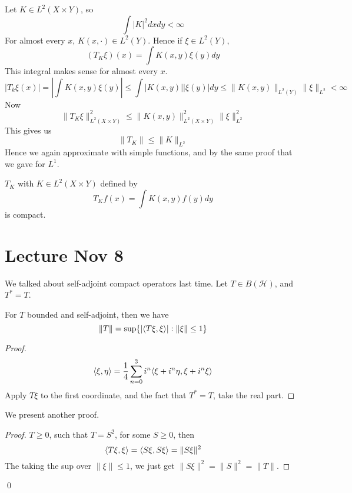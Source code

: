 Let $K\in L^2(X\times Y)$, so 
\begin{equation*}
    \int |K|^2 dxdy<\infty
\end{equation*}
For almost every $x$, $K(x,\cdot)\in L^2(Y)$. Hence if $\xi\in L^2(Y)$, 
\begin{equation*}
    (T_K\xi)(x)=\int K(x,y)\xi(y)dy
\end{equation*}
This integral makes sense for almost every $x$.
\begin{equation*}
    |T_k\xi(x)|=\left|\int K(x,y)\xi(y)\right|\leq \int |K(x,y)||\xi(y)| dy \leq \|K(x,y)\|_{L^2(Y)}\|\xi\|_{L^2}<\infty
\end{equation*}
Now
\begin{equation*}
    \|T_K\xi\|_{L^2(X\times Y)}^2\leq \|K(x,y)\|_{L^2(X\times Y)}^2\|\xi\|_{L^2}^2
\end{equation*}
This gives us 
\begin{equation*}
    \|T_K\|\leq \|K\|_{L^2}
\end{equation*}
Hence we again approximate with simple functions, and by the same proof that we gave for $L^1$.
\begin{corollary}
    $T_K$ with $K\in L^2(X\times Y)$ defined by 
    \begin{equation*}
        T_Kf(x)=\int K(x,y)f(y)dy
    \end{equation*}
    is compact.
\end{corollary}

\section{Lecture Nov 8}
We talked about self-adjoint compact operators last time. Let $T\in B(\mathcal{H})$, and $T^*=T$. 
\begin{proposition}
    For $T$ bounded and self-adjoint, then we have  
    \begin{equation*}
        \|T\|=\sup\{|\langle T\xi, \xi\rangle|: \|\xi\|\leq 1\}
    \end{equation*}
\end{proposition}
\begin{proof}
    \begin{equation*}
        \langle\xi, \eta\rangle=\frac{1}{4}\sum_{n=0}^3 i^n\langle \xi+i^n\eta, \xi+i^n\xi\rangle
    \end{equation*}
    Apply $T\xi$ to the first coordinate, and the fact that $T^*=T$, take the real part.
\end{proof}
We present another proof.
\begin{proof}
    $T\geq 0$, such that $T=S^2$, for some $S\geq 0$, then 
    \begin{equation*}
        \langle T\xi, \xi\rangle=\langle S\xi, S\xi\rangle=\|S\xi\|^2
    \end{equation*}
    The taking the sup over $\|\xi\|\leq 1$, we just get $\|S\xi\|^2=\|S\|^2=\|T\|$.
\end{proof}
\qed


